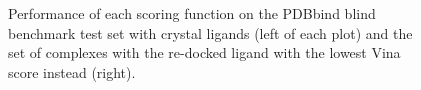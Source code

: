 \begin{figure}
\centering
{}
\caption{Performance of each scoring function on the PDBbind blind benchmark test set with crystal ligands (left of each plot) and the set of complexes with the re-docked ligand with the lowest Vina score instead (right).}
\label{rfscore4:set-2-pdbbind-2012-trn-1}
\end{figure}

